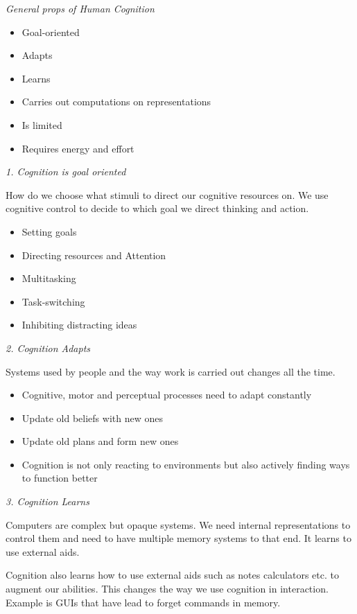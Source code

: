 \textit{General props of Human Cognition} \smallskip

\begin{itemize}[itemsep=-5pt, topsep=0pt, leftmargin=*]
	\item Goal-oriented
	\item Adapts
	\item Learns
	\item Carries out computations on representations
	\item Is limited
	\item Requires energy and effort
\end{itemize}


\textit{1. Cognition is goal oriented} \smallskip

How do we choose what stimuli to direct our cognitive resources on. We use cognitive control to decide to which goal we direct thinking and action.

\begin{itemize}[itemsep=-5pt, topsep=0pt, leftmargin=*]
	\item Setting goals
	\item Directing resources and Attention
	\item Multitasking
	\item Task-switching
	\item Inhibiting distracting ideas
\end{itemize}

\textit{2. Cognition Adapts} \smallskip

Systems used by people and the way work is carried out changes all the time. 
\begin{itemize}[itemsep=-5pt, topsep=0pt, leftmargin=*]
	\item Cognitive, motor and perceptual processes need to adapt constantly
	\item Update old beliefs with new ones
	\item Update old plans and form new ones
	\item Cognition is not only reacting to environments but also actively finding ways to function better
\end{itemize}


\textit{3. Cognition Learns} \smallskip

Computers are complex but opaque systems. We need internal representations to control them and need to have multiple memory systems to that end. 
It learns to use external aids. 

Cognition also learns how to use external aids such as notes calculators etc. to augment our abilities. This changes the way we use cognition in interaction. 
Example is GUIs that have lead to forget commands in memory. 


